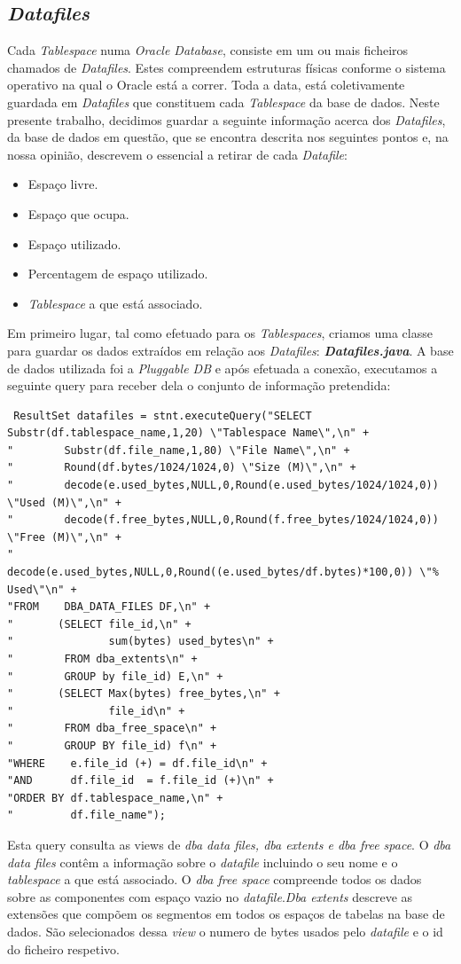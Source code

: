 \subsection*{\textit{Datafiles}}
Cada \textit{Tablespace} numa \textit{Oracle Database}, consiste em um ou mais ficheiros chamados de \textit{Datafiles}. Estes compreendem estruturas físicas conforme o sistema operativo na qual o Oracle está a correr. Toda a data, está coletivamente guardada em \textit{Datafiles} que  constituem cada \textit{Tablespace} da base de dados. 
Neste presente trabalho, decidimos guardar a seguinte informação acerca dos \textit{Datafiles}, da base de dados em questão, que se encontra descrita nos seguintes pontos e, na nossa opinião, descrevem o essencial a retirar de cada \textit{Datafile}:
\begin{itemize}
    \item Espaço livre.
    \item Espaço que ocupa.
    \item Espaço utilizado.
    \item Percentagem de espaço utilizado.
    \item \textit{Tablespace} a que está associado.
\end{itemize}
Em primeiro lugar, tal como efetuado para os \textit{Tablespaces}, criamos uma classe para guardar os dados extraídos em relação aos \textit{Datafiles}: \textit{\textbf{Datafiles.java}}. A base de dados utilizada foi a \textit{Pluggable DB} e após efetuada a conexão, executamos a seguinte query para receber dela o conjunto de informação pretendida:
\begin{lstlisting}
 ResultSet datafiles = stnt.executeQuery("SELECT  Substr(df.tablespace_name,1,20) \"Tablespace Name\",\n" +
"        Substr(df.file_name,1,80) \"File Name\",\n" +
"        Round(df.bytes/1024/1024,0) \"Size (M)\",\n" +
"        decode(e.used_bytes,NULL,0,Round(e.used_bytes/1024/1024,0)) \"Used (M)\",\n" +
"        decode(f.free_bytes,NULL,0,Round(f.free_bytes/1024/1024,0)) \"Free (M)\",\n" +
"        decode(e.used_bytes,NULL,0,Round((e.used_bytes/df.bytes)*100,0)) \"% Used\"\n" +
"FROM    DBA_DATA_FILES DF,\n" +
"       (SELECT file_id,\n" +
"               sum(bytes) used_bytes\n" +
"        FROM dba_extents\n" +
"        GROUP by file_id) E,\n" +
"       (SELECT Max(bytes) free_bytes,\n" +
"               file_id\n" +
"        FROM dba_free_space\n" +
"        GROUP BY file_id) f\n" +
"WHERE    e.file_id (+) = df.file_id\n" +
"AND      df.file_id  = f.file_id (+)\n" +
"ORDER BY df.tablespace_name,\n" +
"         df.file_name");
\end{lstlisting}
\vspace{2mm}
Esta query consulta as views de \textit{dba data files, dba extents e dba free space}. O \textit{dba data files} contêm a informação sobre o \textit{datafile} incluindo o seu nome e o \textit{tablespace} a que está associado. O \textit{dba free space} compreende todos os dados sobre as componentes com espaço vazio no \textit{datafile}.\textit{Dba extents} descreve as extensões que compõem os segmentos em todos os espaços de tabelas na base de dados. São selecionados dessa \textit{view} o numero de bytes usados pelo \textit{datafile}  e o id do ficheiro respetivo.

